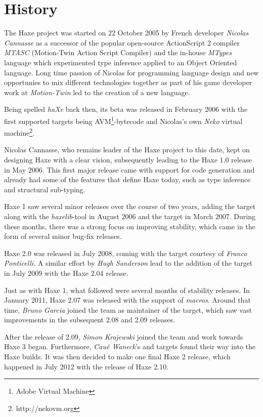 \documentclass{haxe}
\begin{document}
\section{History}
\label{introduction-haxe-history}

The Haxe project was started on 22 October 2005 by French developer \emph{Nicolas Cannasse} as a successor of the popular open-source ActionScript 2 compiler \emph{MTASC} (Motion-Twin Action Script Compiler) and the in-house \emph{MTypes} language which experimented type inference applied to an Object Oriented language. Long time passion of Nicolas for programming language design and new opportunies to mix different technologies together as part of his game developer work at \emph{Motion-Twin} led to the creation of a new language.

Being spelled \emph{haXe} back then, its beta was released in February 2006 with the first supported targets being AVM\footnote{Adobe Virtual Machine}-bytecode and Nicolas's own \emph{Neko} virtual machine\footnote{http://nekovm.org}.

Nicolas Cannasse, who remains leader of the Haxe project to this date, kept on designing Haxe with a clear vision, subsequently leading to the Haxe 1.0 release in May 2006. This first major release came with support for  code generation and already had some of the features that define Haxe today, such as type inference and structural sub-typing.

Haxe 1 saw several minor releases over the course of two years, adding the  target along with the \emph{haxelib}-tool in August 2006 and the  target in March 2007. During these months, there was a strong focus on improving stability, which came in the form of several minor bug-fix releases.

Haxe 2.0 was released in July 2008, coming with the  target courtesy of \emph{Franco Ponticelli}. A similar effort by \emph{Hugh Sanderson} lead to the addition of the  target in July 2009 with the Haxe 2.04 release.

Just as with Haxe 1, what followed were several months of stability releases. In January 2011, Haxe 2.07 was released with the support of \emph{macros}. Around that time, \emph{Bruno Garcia} joined the team as maintainer of the  target, which saw vast improvements in the subsequent 2.08 and 2.09 releases.

After the release of 2.09, \emph{Simon Krajewski} joined the team and work towards Haxe 3 began. Furthermore, \emph{Cau\^{e} Waneck}'s  and  targets found their way into the Haxe builds. It was then decided to make one final Haxe 2 release, which happened in July 2012 with the release of Haxe 2.10.
\end{document}
